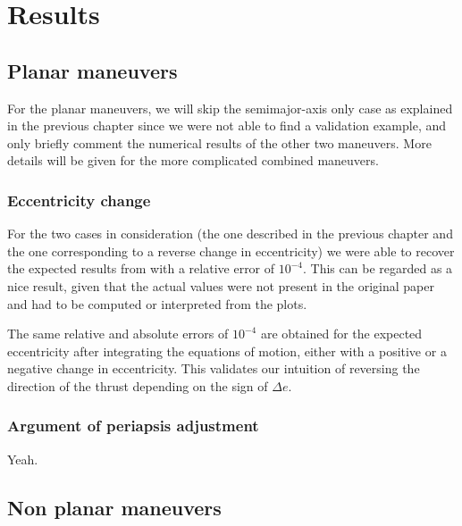 \chapter{Results} \label{sec:results}

\section{Planar maneuvers} \label{sec:resplanar}

For the planar maneuvers, we will skip the semimajor-axis only case as explained in the previous chapter since we were not able to find a validation example, and only briefly comment the numerical results of the other two maneuvers. More details will be given for the more complicated combined maneuvers.

\subsection{Eccentricity change} \label{sec:resecc}

For the two cases in consideration (the one described in the previous chapter and the one corresponding to a reverse change in eccentricity) we were able to recover the expected results from \cite{pollard1997simplified} with a relative error of $10^{-4}$. This can be regarded as a nice result, given that the actual values were not present in the original paper and had to be computed or interpreted from the plots.

The same relative and absolute errors of $10^{-4}$ are obtained for the expected eccentricity after integrating the equations of motion, either with a positive or a negative change in eccentricity. This validates our intuition of reversing the direction of the thrust depending on the sign of $\Delta e$.

\subsection{Argument of periapsis adjustment}

Yeah.

\clearpage

\section{Non planar maneuvers} \label{sec:resnonplanar}

